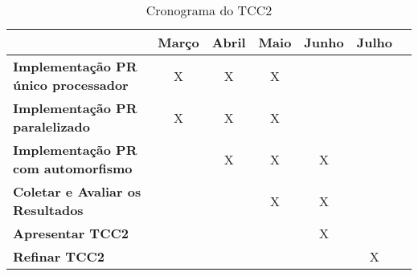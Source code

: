 \begin{table}[h]
\centering
\caption{Cronograma do TCC2}
\label{cronograma tcc2}
\begin{adjustbox}{width=\textwidth}
\begin{tabular}{|l|c|c|c|c|c|c|}
\hline
                                            & \multicolumn{1}{l|}{\textbf{Março}} & \multicolumn{1}{l|}{\textbf{Abril}} & \multicolumn{1}{l|}{\textbf{Maio}} & \multicolumn{1}{l|}{\textbf{Junho}} & \multicolumn{1}{l|}{\textbf{Julho}} \\ \hline
\textbf{Implementação PR único processador} & X                                   & X                                   & X                                  &                                     &                                     \\ \hline
\textbf{Implementação PR paralelizado}      & X                                   & X                                   & X                                  &                                     &                                     \\ \hline
\textbf{Implementação PR com automorfismo}  &                                     & X                                   & X                                  & X                                   &                                     \\ \hline
\textbf{Coletar e Avaliar os Resultados}    &                                     &                                     & X                                  & X                                   &                                     \\ \hline
\textbf{Apresentar TCC2}                    &                                     &                                     &                                    & X                                   &                                     \\ \hline
\textbf{Refinar TCC2}                       &                                     &                                     &                                    &                                     & X                                   \\ \hline
\end{tabular}
\end{adjustbox}
\end{table}

